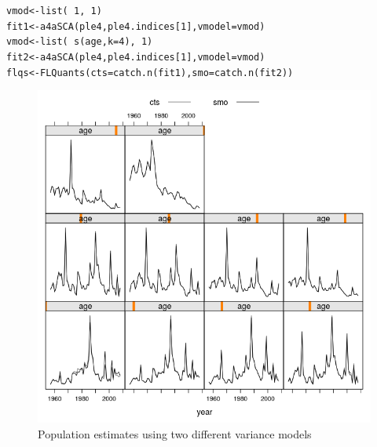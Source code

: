 \documentclass[a4paper,english,10pt]{article}\usepackage[]{graphicx}\usepackage[]{color}
\makeatletter
\newcommand{\hlnum}[1]{\textcolor[rgb]{0.063,0.58,0.627}{#1}}%
\newcommand{\hlopt}[1]{\textcolor[rgb]{0.196,0.196,0.196}{#1}}%
\newcommand{\hlstd}[1]{\textcolor[rgb]{0.196,0.196,0.196}{#1}}%
\newcommand{\hlkwb}[1]{\textcolor[rgb]{0.627,0,0.314}{#1}}%
\newcommand{\hlkwc}[1]{\textcolor[rgb]{0,0.631,0.314}{#1}}%
\newcommand{\hlkwd}[1]{\textcolor[rgb]{0.78,0.227,0.412}{#1}}%
\newenvironment{kframe}{%
 \def\at@end@of@kframe{}%
 \ifinner\ifhmode%
  \def\at@end@of@kframe{\end{minipage}}%
  \begin{minipage}{\columnwidth}%
 \fi\fi%
 \def\FrameCommand##1{\hskip\@totalleftmargin \hskip-\fboxsep
 \colorbox{shadecolor}{##1}\hskip-\fboxsep
     \hskip-\linewidth \hskip-\@totalleftmargin \hskip\columnwidth}%
 \MakeFramed {\advance\hsize-\width
   \@totalleftmargin\z@ \linewidth\hsize
   \@setminipage}}%
 {\par\unskip\endMakeFramed%
 \at@end@of@kframe}
\newenvironment{knitrout}{}{} %
\makeatother
\begin{document}
\begin{knitrout}
\color{fgcolor}\begin{kframe}
\begin{alltt}
\hlstd{vmod} \hlkwb{<-} \hlkwd{list}\hlstd{(}\hlopt{~}\hlnum{1}\hlstd{,} \hlopt{~}\hlnum{1}\hlstd{)}
\hlstd{fit1} \hlkwb{<-} \hlkwd{a4aSCA}\hlstd{(ple4, ple4.indices[}\hlnum{1}\hlstd{],} \hlkwc{vmodel} \hlstd{= vmod)}
\hlstd{vmod} \hlkwb{<-} \hlkwd{list}\hlstd{(}\hlopt{~}\hlkwd{s}\hlstd{(age,} \hlkwc{k} \hlstd{=} \hlnum{4}\hlstd{),} \hlopt{~}\hlnum{1}\hlstd{)}
\hlstd{fit2} \hlkwb{<-} \hlkwd{a4aSCA}\hlstd{(ple4, ple4.indices[}\hlnum{1}\hlstd{],} \hlkwc{vmodel} \hlstd{= vmod)}
\hlstd{flqs} \hlkwb{<-} \hlkwd{FLQuants}\hlstd{(}\hlkwc{cts} \hlstd{=} \hlkwd{catch.n}\hlstd{(fit1),} \hlkwc{smo} \hlstd{=} \hlkwd{catch.n}\hlstd{(fit2))}
\end{alltt}
\end{kframe}
\end{knitrout}

\begin{knitrout}
\color{fgcolor}\begin{figure}[H]

{\centering \includegraphics[width=.9\linewidth]{figure/varmod-1} 

}

\caption[Population estimates using two different variance models]{Population estimates using two different variance models}\label{fig:varmod}
\end{figure}


\end{knitrout}
\end{document}
